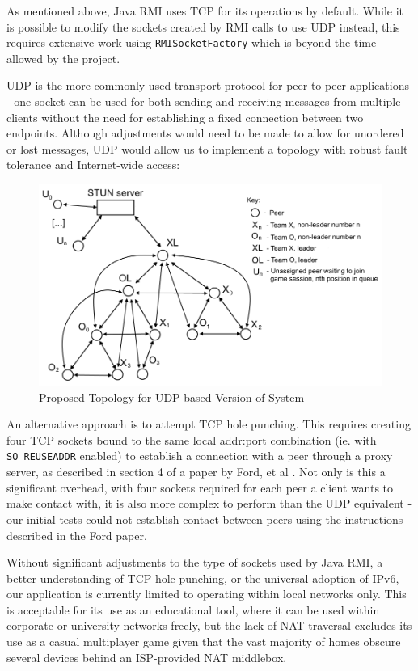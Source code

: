 \documentclass[conference]{IEEEtran}
\begin{document}
As mentioned above, Java RMI uses TCP for its operations by default. While it is possible to modify the sockets created by RMI calls to use UDP instead, this requires extensive work using \texttt{RMISocketFactory} which is beyond the time allowed by the project.

UDP is the more commonly used transport protocol for peer-to-peer applications - one socket can be used for both sending and receiving messages from multiple clients without the need for establishing a fixed connection between two endpoints. Although adjustments would need to be made to allow for unordered or lost messages, UDP would allow us to implement a topology with robust fault tolerance and Internet-wide access:

\begin{figure}[h]
	\includegraphics[width=\linewidth]{images/p2p-topology-3point.png}
	\caption{Proposed Topology for UDP-based Version of System}
	\label{fig:topology-udp}
\end{figure}

An alternative approach is to attempt TCP hole punching. This requires creating four TCP sockets bound to the same local addr:port combination (ie. with \texttt{SO\_REUSEADDR} enabled) to establish a connection with a peer through a proxy server, as described in section 4 of a paper by Ford, et al \cite{ford_srisuresh_kegel_2005}. Not only is this a significant overhead, with four sockets required for each peer a client wants to make contact with, it is also more complex to perform than the UDP equivalent - our initial tests could not establish contact between peers using the instructions described in the Ford paper.

Without significant adjustments to the type of sockets used by Java RMI, a better understanding of TCP hole punching, or the universal adoption of IPv6, our application is currently limited to operating within local networks only. This is acceptable for its use as an educational tool, where it can be used within corporate or university networks freely, but the lack of NAT traversal excludes its use as a casual multiplayer game given that the vast majority of homes obscure several devices behind an ISP-provided NAT middlebox.
\end{document}
